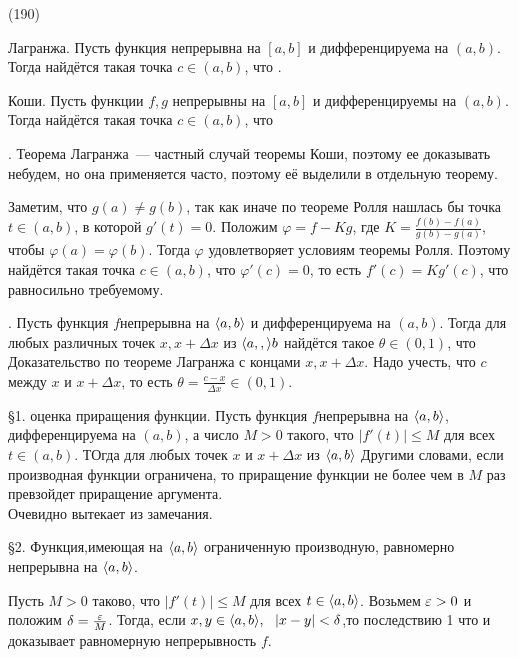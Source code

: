 (190)

\T \q Лагранжа. Пусть функция непрерывна на $[a, b]$ и дифференцируема на $(a, b)$. Тогда найдётся такая точка $c \in (a, b)$, что .

\T \q Коши. Пусть функции $f, g$ непрерывны на $[a, b]$ и дифференцируемы на $(a, b)$. Тогда найдётся такая точка $c \in (a, b)$, что 

. Теорема Лагранжа~--- частный случай теоремы Коши, поэтому ее доказывать небудем, но она применяется часто, поэтому её выделили в отдельную теорему.

\D Заметим, что $g(a) \neq g(b)$, так как иначе по теореме Ролля нашлась бы точка $t \in (a, b)$, в которой $g'(t) = 0$. Положим $\varphi = f - Kg$, где $K = \frac{f(b) - f(a)}{g(b) - g(a)}$, чтобы $\varphi(a) = \varphi(b)$. Тогда $\varphi$ удовлетворяет условиям теоремы Ролля. Поэтому найдётся такая точка $c \in (a, b)$, что $\varphi'(c) = 0$, то есть $f'(c) = Kg'(c)$, что равносильно требуемому.

. Пусть функция $f$непрерывна на $\langle a, b \rangle$ и дифференцируема на $(a, b)$. Тогда для любых различных точек $x, x+ \Delta x$ из $\langle a, , \rangle b$ найдётся такое $\theta \in (0, 1)$, что  Доказательство по теореме Лагранжа с концами $x, x + \Delta x$. Надо учесть, что $c$ между $x$ и $x + \Delta x$, то есть $\theta = \frac{c - x}{\Delta x} \in (0, 1)$.

\S1. \q оценка приращения функции. Пусть функция $f$непрерывна на $\langle a, b \rangle$, дифференцируема на $(a, b)$, а число $M > 0$ такого, что $|f'(t)| \le M$ для всех $t \in (a, b)$. ТОгда для любых точек $x$ и $x + \Delta x$ из $\langle a, b \rangle$  Другими словами, если производная функции ограничена, то приращение функции не более чем в $M$ раз превзойдет приращение аргумента.\\
Очевидно вытекает из замечания.

\S2. Функция,имеющая на $\langle a, b \rangle$ ограниченную производную, равномерно непрерывна на $\langle a, b \rangle$.

\D Пусть $M > 0$ таково, что $|f'(t)| \le M$ для всех $t \in \langle a, b \rangle$. Возьмем $\varepsilon > 0$ и положим $\delta = \frac {\varepsilon} M$. Тогда, если $x, y \in \langle a, b \rangle,\ \  |x-y| < \delta$,то последствию 1  что и доказывает равномерную непрерывность $f$.